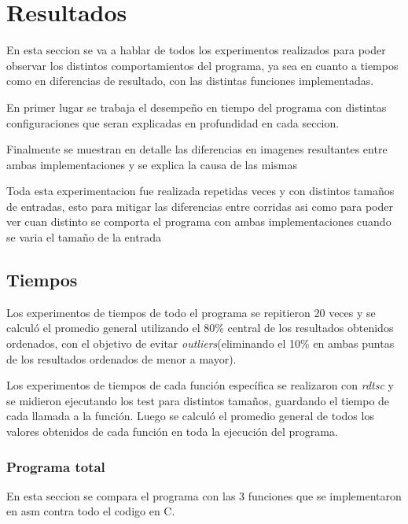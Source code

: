 \section{Resultados}

En esta seccion se va a hablar de todos los experimentos realizados para poder observar los distintos
comportamientos del programa, ya sea en cuanto a tiempos como en diferencias de resultado, con
las distintas funciones implementadas.

En primer lugar se trabaja el desempeño en tiempo del programa con distintas configuraciones
que seran explicadas en profundidad en cada seccion.

Finalmente se muestran en detalle las diferencias en imagenes resultantes entre ambas implementaciones y se
explica la causa de las mismas

Toda esta experimentacion fue realizada repetidas veces y con distintos tamaños de entradas,
esto para mitigar las diferencias entre corridas asi como para poder ver cuan distinto se comporta el programa
con ambas implementaciones cuando se varia el tamaño de la entrada

\subsection{Tiempos}

Los experimentos de tiempos de todo el programa se repitieron 20 veces y se calculó el
promedio general utilizando el 80\% central de los resultados obtenidos ordenados, con el objetivo de evitar
{\it outliers\/}(eliminando el 10\% en ambas puntas de los resultados ordenados de menor a mayor).


Los experimentos de tiempos de cada función específica se realizaron con {\it rdtsc\/} y se
midieron ejecutando los test para distintos tamaños, guardando el tiempo de cada
llamada a la función.
Luego se calculó el promedio general de todos los valores obtenidos de cada
función en toda la ejecución del programa.


\subsubsection{Programa total}
En esta seccion se compara el programa con las 3 funciones que se implementaron en asm
contra todo el codigo en C.

